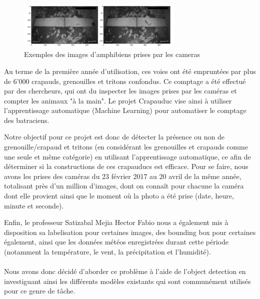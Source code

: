 \newpage

\begin{figure}[!htb]
    \centering
    \includegraphics[width=300px]{images/introduction_crapauduc_exemple_prise_camera.png}
    \caption{Exemples des images d'amphibiens prises par les cameras}
    \label{fig:Exemples des images d'amphibiens prises par les cameras}
\end{figure}

Au terme de la première année d'utilisation, ces voies ont été empruntées par plus de 6'000 crapauds, grenouilles et tritons confondus. Ce comptage a été effectué par des chercheurs, qui ont du inspecter les images prises par les caméras et compter les animaux "à la main". Le projet Crapauduc vise ainsi à utiliser l'apprentissage automatique (Machine Learning) pour automatiser le comptage des batraciens. \newline

Notre objectif pour ce projet est donc de détecter la présence ou non de grenouille/crapaud et tritons (en considérant les grenouilles et crapauds comme une seule et même catégorie) en utilisant l'apprentissage automatique, ce afin de déterminer si la constructions de ces crapauducs est efficace. Pour se faire, nous avons les prises des caméras du 23 février 2017 au 20 avril de la même année, totalisant près d'un million d'images, dont on connaît pour chacune la caméra dont elle provient ainsi que le moment où la photo a été prise (date, heure, minute et seconde). \newline

Enfin, le professeur Satizabal Mejia Hector Fabio nous a également mis à disposition sa labelisation pour certaines images, des bounding box pour certaines également, ainsi que les données météos enregistrées durant cette période (notamment la température, le vent, la précipitation et l'humidité).

\paragraph{}
Nous avons donc décidé d'aborder ce problème à l'aide de l'object detection en investiguant ainsi les différents modèles existants qui sont communément utilisés pour ce genre de tâche.


